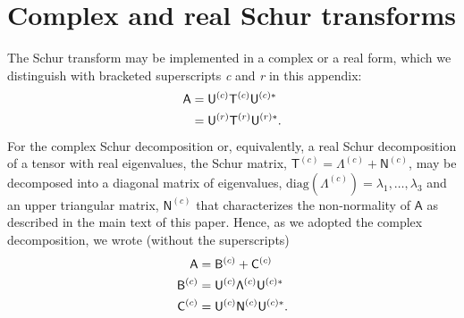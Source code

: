 \documentclass[preprint,amssymb,amsmath,aip,cha]{revtex4-1}
\begin{document}
\appendix
\label{app.schur}
\section{Complex and real {S}chur transforms} 
The Schur transform \citep{schur1909} may be implemented in a complex or a real form, which we distinguish with bracketed superscripts \emph{c} and \emph{r} in this appendix:
\begin{align}
\notag{}
\mathsf{A} &= \mathsf{U}^{(c)}\mathsf{T}^{(c)}\mathsf{U}^{(c) *}\\
 &= \mathsf{U}^{(r)}\mathsf{T}^{(r)}\mathsf{U}^{(r) *}.
\end{align}
For the complex Schur decomposition or, equivalently, a real Schur decomposition of a tensor with real eigenvalues, the Schur matrix, $\mathsf{T}^{(c)} = \mathsf{\Lambda}^{(c)} + \mathsf{N}^{(c)}$, may be decomposed into a diagonal matrix of eigenvalues, $\mbox{diag}(\mathsf{\Lambda}^{(c)}) = \lambda_{1}, \ldots, \lambda_{3}$ and an upper triangular matrix, $\mathsf{N}^{(c)}$ that characterizes the non-normality of $\mathsf{A}$ \citep{GolubVanLoan13} as described in the main text of this paper. Hence, as we adopted the complex decomposition, we wrote (without the superscripts)
\begin{align}
\notag{}
\mathsf{A} &= \mathsf{B}^{(c)} + \mathsf{C}^{(c)}\\
\notag{}
\mathsf{B}^{(c)} &= \mathsf{U}^{(c)}\mathsf{\Lambda}^{(c)}\mathsf{U}^{(c) *}\\
\mathsf{C}^{(c)} &= \mathsf{U}^{(c)}\mathsf{N}^{(c)}\mathsf{U}^{(c) *}.
\label{eq.appenschur}
\end{align} 
\end{document}
